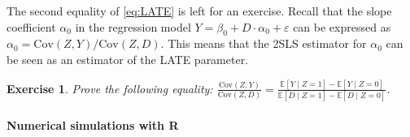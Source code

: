 \documentclass[10.5pt, A4paper, openany, uplatex]{book}
\newcommand{\eps}{\varepsilon}
\newcommand{\E}{\mathbb{E}}
\newcommand{\Cov}{\mathrm{Cov}}
\newtheorem{exercise}[theorem]{Exercise}
\numberwithin{equation}{section}
\begin{document}
The second equality of \eqref{eq:LATE} is left for an exercise.
Recall that the slope coefficient $\alpha_0$ in the regression model $Y = \beta_0 + D \cdot \alpha_0 + \eps$ can be expressed as $\alpha_0 = \Cov(Z, Y)/\Cov(Z, D)$.
This means that the 2SLS estimator for $\alpha_0$ can be seen as an estimator of the LATE parameter.

\begin{framed}
\begin{exercise}\upshape
	Prove the following equality: $\displaystyle \frac{\Cov(Z, Y)}{\Cov(Z, D)} = \frac{\E[Y \mid Z = 1] - \E[Y \mid Z = 0]}{\E[D \mid Z = 1] - \E[D \mid Z = 0]}$.
\end{exercise}
\end{framed}

\paragraph{Numerical simulations with \textbf{R}}
\end{document}
